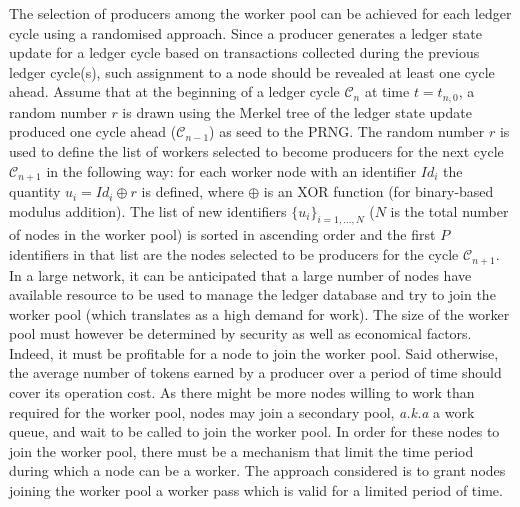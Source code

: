 
The selection of producers among the worker pool can be achieved for each ledger cycle using a randomised approach. Since a producer generates a ledger state update for a ledger cycle based on transactions collected during the previous ledger cycle(s), such assignment to a node should be revealed at least one cycle ahead. Assume that at the beginning of a ledger cycle $\mathcal{C}_n$ at time $t = t_{n,0}$, a random number $r$ is drawn using the Merkel tree of the ledger state update produced one cycle ahead ($\mathcal{C}_{n-1}$) as seed to the PRNG. The random number $r$ is used to define the list of workers selected to become producers for the next cycle $\mathcal{C}_{n+1}$ in the following way: for each worker node with an identifier $Id_i$ the quantity $u_i = Id_i \oplus r$ is defined, where $\oplus$ is an XOR function (for binary-based modulus addition). The list of new identifiers $\{u_i \}_{i=1,...,N}$ ($N$ is the total number of nodes in the worker pool) is sorted in ascending order and the first $P$ identifiers in that list are the nodes selected to be producers for the cycle $\mathcal{C}_{n+1}$.\\


In a large network, it can be anticipated that a large number of nodes have available resource to be used to manage the ledger database and try to join the worker pool (which translates as a high demand for work).
The size of the worker pool must however be determined by security as well as economical factors. Indeed, it must be profitable for a node to join the worker pool. Said otherwise, the average number of tokens earned by a producer over a period of time should cover its operation cost. As there might be more nodes willing to work than required for the worker pool, nodes may join a secondary pool, \textit{a.k.a} a work queue, and wait to be called to join the worker pool. In order for these nodes to join the worker pool, there must be a mechanism that limit the time period during which a node can be a worker. The approach considered is to grant nodes joining the worker pool a worker pass which is valid for a limited period of time. 

